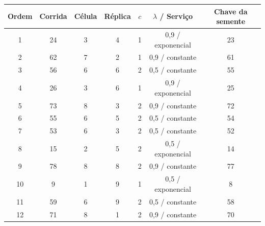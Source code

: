 \begin{tabular}{ccccccc}
\toprule
Ordem & Corrida & Célula & Réplica & $c$ & $\lambda$ / Serviço & Chave da semente \\
\midrule
1 & 24 & 3 & 4 & 1 & 0,9 / exponencial & 23 \\
2 & 62 & 7 & 2 & 1 & 0,9 / constante & 61 \\
3 & 56 & 6 & 6 & 2 & 0,5 / constante & 55 \\
4 & 26 & 3 & 6 & 1 & 0,9 / exponencial & 25 \\
5 & 73 & 8 & 3 & 2 & 0,9 / constante & 72 \\
6 & 55 & 6 & 5 & 2 & 0,5 / constante & 54 \\
7 & 53 & 6 & 3 & 2 & 0,5 / constante & 52 \\
8 & 15 & 2 & 5 & 2 & 0,5 / exponencial & 14 \\
9 & 78 & 8 & 8 & 2 & 0,9 / constante & 77 \\
10 & 9 & 1 & 9 & 1 & 0,5 / exponencial & 8 \\
11 & 59 & 6 & 9 & 2 & 0,5 / constante & 58 \\
12 & 71 & 8 & 1 & 2 & 0,9 / constante & 70 \\
\bottomrule
\end{tabular}
